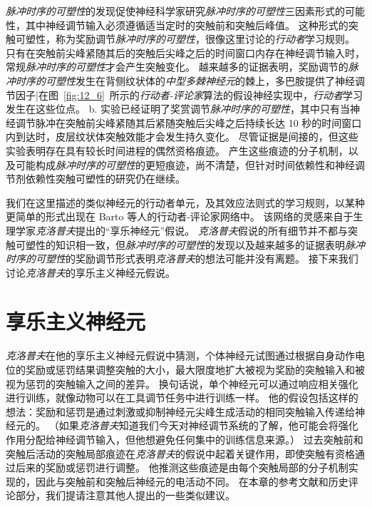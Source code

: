 \textit{脉冲时序的可塑性}的发现促使神经科学家研究\textit{脉冲时序的可塑性}三因素形式的可能性，其中神经调节输入必须遵循适当定时的突触前和突触后峰值。
这种形式的突触可塑性，称为奖励调节\textit{脉冲时序的可塑性}，很像这里讨论的\textit{行动者}学习规则。
只有在突触前尖峰紧随其后的突触后尖峰之后的时间窗口内存在神经调节输入时，常规\textit{脉冲时序的可塑性}才会产生突触变化。
越来越多的证据表明，奖励调节的\textit{脉冲时序的可塑性}发生在背侧纹状体的\textit{中型多棘神经元}的棘上，多巴胺提供了神经调节因子|在图~\ref{fig:12_6}~所示的\textit{行动者-评论家}算法的假设神经实现中，\textit{行动者}学习发生在这些位点。
b. 实验已经证明了奖赏调节\textit{脉冲时序的可塑性}，其中只有当神经调节脉冲在突触前尖峰紧随其后紧随突触后尖峰之后持续长达 10 秒的时间窗口内到达时，皮层纹状体突触效能才会发生持久变化\cite{yagishita2014critical}。
尽管证据是间接的，但这些实验表明存在具有较长时间进程的偶然资格痕迹。
产生这些痕迹的分子机制，以及可能构成\textit{脉冲时序的可塑性}的更短痕迹，尚不清楚，但针对时间依赖性和神经调节剂依赖性突触可塑性的研究仍在继续。


我们在这里描述的类似神经元的行动者单元，及其效应法则式的学习规则，以某种更简单的形式出现在 Barto 等人的行动者-评论家网络中\cite{barto13neuron}。
该网络的灵感来自于生理学家\textit{克洛普夫}提出的“享乐神经元”假说\cite{klopf1972brain,klopf1982hedonistic}。
\textit{克洛普夫}假说的所有细节并不都与突触可塑性的知识相一致，但\textit{脉冲时序的可塑性}的发现以及越来越多的证据表明\textit{脉冲时序的可塑性}的奖励调节形式表明\textit{克洛普夫}的想法可能并没有离题。
接下来我们讨论\textit{克洛普夫}的享乐主义神经元假说。



\section{享乐主义神经元} \label{sec:hedonistic_neurons}


\textit{克洛普夫}\cite{klopf1972brain,klopf1982hedonistic}在他的享乐主义神经元假说中猜测，个体神经元试图通过根据自身动作电位的奖励或惩罚结果调整突触的大小，最大限度地扩大被视为奖励的突触输入和被视为惩罚的突触输入之间的差异。
换句话说，单个神经元可以通过响应相关强化进行训练，就像动物可以在工具调节任务中进行训练一样。
他的假设包括这样的想法：奖励和惩罚是通过刺激或抑制神经元尖峰生成活动的相同突触输入传递给神经元的。
（如果\textit{克洛普夫}知道我们今天对神经调节系统的了解，他可能会将强化作用分配给神经调节输入，但他想避免任何集中的训练信息来源。）
过去突触前和突触后活动的突触局部痕迹在\textit{克洛普夫}的假说中起着关键作用，即使突触有资格通过后来的奖励或惩罚进行调整。
他推测这些痕迹是由每个突触局部的分子机制实现的，因此与突触前和突触后神经元的电活动不同。
在本章的参考文献和历史评论部分，我们提请注意其他人提出的一些类似建议。



